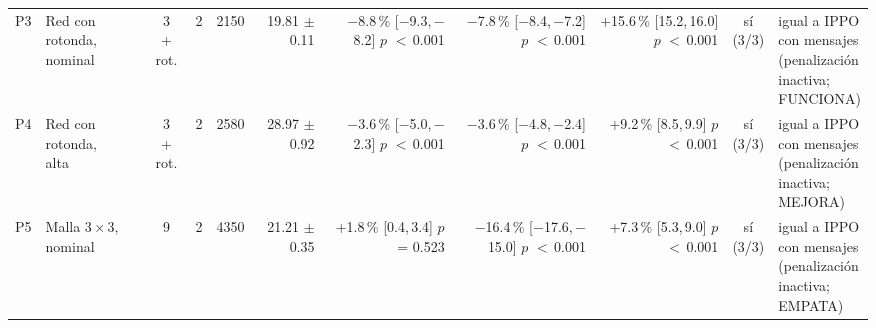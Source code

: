 \begin{table}[H]
\begin{tabular}{llcrrrrrrcl}
P3 & \makecell[l]{Red con\\{}rotonda,\\{}nominal} & \makecell[c]{3\\{}+ rot.} & 2 & 2150 & \makecell[r]{19.81\\{}$\pm$ 0.11} & \makecell[r]{$-$8.8\,\%\\{}[$-$9.3,\,$-$8.2]\\$p$ $<$\,0.001} & \makecell[r]{$-$7.8\,\%\\{}[$-$8.4,\,$-$7.2]\\$p$ $<$\,0.001} & \makecell[r]{+15.6\,\%\\{}[15.2,\,16.0]\\$p$ $<$\,0.001} & \makecell[c]{sí\\{}(3/3)} & \makecell[l]{igual a IPPO\\{}con mensajes\\{}(penalización\\{}inactiva;\\{}FUNCIONA)} \\
P4 & \makecell[l]{Red con\\{}rotonda,\\{}alta} & \makecell[c]{3\\{}+ rot.} & 2 & 2580 & \makecell[r]{28.97\\{}$\pm$ 0.92} & \makecell[r]{$-$3.6\,\%\\{}[$-$5.0,\,$-$2.3]\\$p$ $<$\,0.001} & \makecell[r]{$-$3.6\,\%\\{}[$-$4.8,\,$-$2.4]\\$p$ $<$\,0.001} & \makecell[r]{+9.2\,\%\\{}[8.5,\,9.9]\\$p$ $<$\,0.001} & \makecell[c]{sí\\{}(3/3)} & \makecell[l]{igual a IPPO\\{}con mensajes\\{}(penalización\\{}inactiva;\\{}MEJORA)} \\
P5 & \makecell[l]{Malla $3 \times 3$,\\{}nominal} & 9 & 2 & 4350 & \makecell[r]{21.21\\{}$\pm$ 0.35} & \makecell[r]{+1.8\,\%\\{}[0.4,\,3.4]\\$p$ = 0.523} & \makecell[r]{$-$16.4\,\%\\{}[$-$17.6,\,$-$15.0]\\$p$ $<$\,0.001} & \makecell[r]{+7.3\,\%\\{}[5.3,\,9.0]\\$p$ $<$\,0.001} & \makecell[c]{sí\\{}(3/3)} & \makecell[l]{igual a IPPO\\{}con mensajes\\{}(penalización\\{}inactiva;\\{}EMPATA)} \\

\end{tabular}
\end{table}
